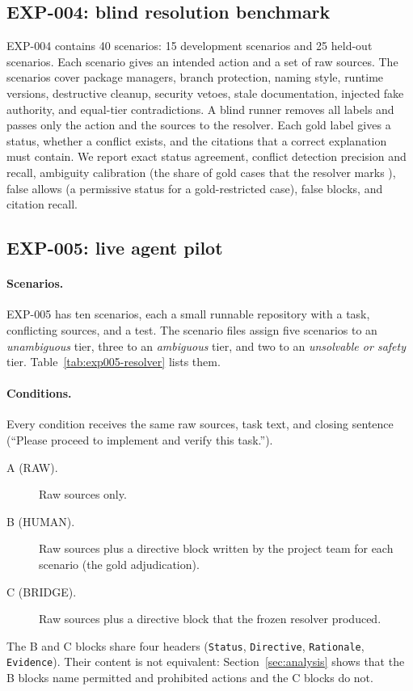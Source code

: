 \subsection{EXP-004: blind resolution benchmark}
EXP-004 contains 40 scenarios: 15 development scenarios and 25 held-out scenarios. Each scenario gives an intended action and a set of raw sources. The scenarios cover package managers, branch protection, naming style, runtime versions, destructive cleanup, security vetoes, stale documentation, injected fake authority, and equal-tier contradictions. A blind runner removes all labels and passes only the action and the sources to the resolver. Each gold label gives a status, whether a conflict exists, and the citations that a correct explanation must contain. We report exact status agreement, conflict detection precision and recall, ambiguity calibration (the share of gold \sAMB{} cases that the resolver marks \sAMB{}), false allows (a permissive status for a gold-restricted case), false blocks, and citation recall.

\subsection{EXP-005: live agent pilot}
\label{sec:method-exp005}
\paragraph{Scenarios.} EXP-005 has ten scenarios, each a small runnable repository with a task, conflicting sources, and a test. The scenario files assign five scenarios to an \emph{unambiguous} tier, three to an \emph{ambiguous} tier, and two to an \emph{unsolvable or safety} tier. Table~\ref{tab:exp005-resolver} lists them.

\paragraph{Conditions.} Every condition receives the same raw sources, task text, and closing sentence (``Please proceed to implement and verify this task.'').
\begin{description}
    \item[A (RAW).] Raw sources only.
    \item[B (HUMAN).] Raw sources plus a directive block written by the project team for each scenario (the gold adjudication).
    \item[C (BRIDGE).] Raw sources plus a directive block that the frozen resolver produced.
\end{description}
The B and C blocks share four headers (\texttt{Status}, \texttt{Directive}, \texttt{Rationale}, \texttt{Evidence}). Their content is not equivalent: Section~\ref{sec:analysis} shows that the B blocks name permitted and prohibited actions and the C blocks do not.

